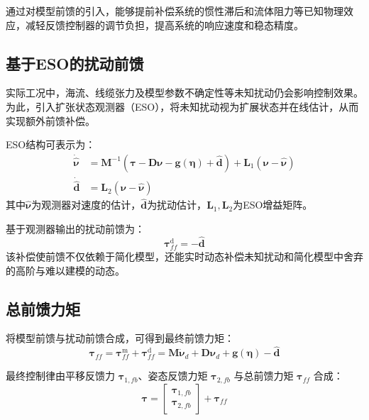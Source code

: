 通过对模型前馈的引入，能够提前补偿系统的惯性滞后和流体阻力等已知物理效应，减轻反馈控制器的调节负担，提高系统的响应速度和稳态精度。

\subsection{基于ESO的扰动前馈}

实际工况中，海流、线缆张力及模型参数不确定性等未知扰动仍会影响控制效果。为此，引入扩张状态观测器（ESO），将未知扰动视为扩展状态并在线估计，从而实现额外前馈补偿。

ESO结构可表示为：
\begin{align}
    \dot{\hat{\boldsymbol{\nu}}}
    &= \boldsymbol{M}^{-1}
    \left(
    \boldsymbol{\tau}
    -\boldsymbol{D}\boldsymbol{\nu}
    -\boldsymbol{g}(\boldsymbol{\eta})
    +\hat{\boldsymbol{d}}
    \right)
    + \boldsymbol{L}_1
    \left(\boldsymbol{\nu}-\hat{\boldsymbol{\nu}}\right)
    \\
    \dot{\hat{\boldsymbol{d}}}
    &= \boldsymbol{L}_2
    \left(\boldsymbol{\nu}-\hat{\boldsymbol{\nu}}\right)
\end{align}
其中$\hat{\boldsymbol{\nu}}$为观测器对速度的估计，$\hat{\boldsymbol{d}}$为扰动估计，$\boldsymbol{L}_1,\boldsymbol{L}_2$为ESO增益矩阵。

基于观测器输出的扰动前馈为：
\begin{equation}
    \boldsymbol{\tau}_{ff}^{\mathrm{d}} = -\hat{\boldsymbol{d}}
\end{equation}
该补偿使前馈不仅依赖于简化模型，还能实时动态补偿未知扰动和简化模型中舍弃的高阶与难以建模的动态。

\subsection{总前馈力矩}

将模型前馈与扰动前馈合成，可得到最终前馈力矩：
\begin{equation}
    \boldsymbol{\tau}_{ff} =
    \boldsymbol{\tau}_{ff}^{\mathrm{m}} +
    \boldsymbol{\tau}_{ff}^{\mathrm{d}}
    =
    \boldsymbol{M}\dot{\boldsymbol{\nu}}_d +
    \boldsymbol{D}\boldsymbol{\nu}_d +
    \boldsymbol{g}(\boldsymbol{\eta}) - \hat{\boldsymbol{d}}
\end{equation}

最终控制律由平移反馈力 $\boldsymbol{\tau}_{1,fb}$、姿态反馈力矩 $\boldsymbol{\tau}_{2,fb}$ 与总前馈力矩 $\boldsymbol{\tau}_{ff}$ 合成：
\begin{equation}
    \boldsymbol{\tau} =
    \begin{bmatrix} \boldsymbol{\tau}_{1,fb} \\ \boldsymbol{\tau}_{2,fb} \end{bmatrix}
    + \boldsymbol{\tau}_{ff}
\end{equation}

